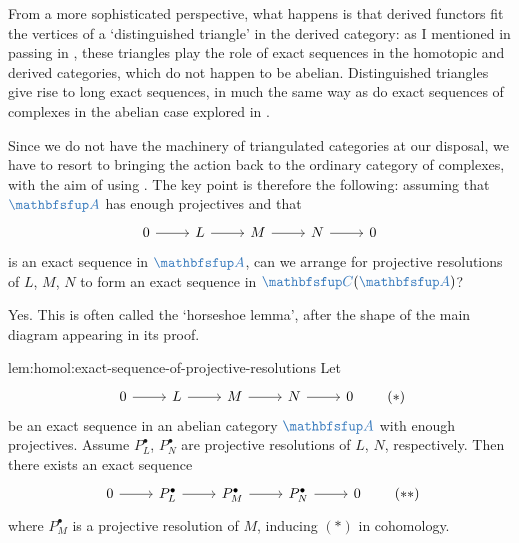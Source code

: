 From a more sophisticated perspective, what happens is that derived
functors fit the vertices of a `distinguished triangle' in the derived
category: as I mentioned in passing in
,
these triangles play the role of exact sequences in the homotopic and
derived categories, which do not happen to be abelian. Distinguished
triangles give rise to long exact sequences, in much the same way as
do exact sequences of complexes in the abelian case explored in
.

Since we do not have the machinery of triangulated categories at our
disposal, we have to resort to bringing the action back to the
ordinary category of complexes, with the aim of using
.  The key point is therefore the following: assuming
that $\categ{A}$ has enough projectives and that
\[\begin{tikzcd}
    0 \arrow[r] & L \arrow[r] & M \arrow[r] & N \arrow[r] & 0
  \end{tikzcd}\] is an exact sequence in $\categ{A}$, can we arrange
for projective resolutions of $L$, $M$, $N$ to form an exact sequence
in $\categ{C}(\categ{A})$?

Yes. This is often called the `horseshoe lemma', after the shape of
the main diagram appearing in its proof.

\begin{lem}{}{lem:homol:exact-sequence-of-projective-resolutions}
  Let
  \[\begin{tikzcd}
      0 \arrow[r] & L \arrow[r] & M \arrow[r] & N \arrow[r] & 0
    \end{tikzcd} \tag{$*$}\] be an exact sequence in an abelian
  category $\categ{A}$ with enough projectives. Assume $P_L^\bullet$,
  $P_N^\bullet$ are projective resolutions of $L$, $N$,
  respectively. Then there exists an exact sequence
  \[\begin{tikzcd}
      0 \arrow[r] & P_L^\bullet \arrow[r] & P_M^\bullet \arrow[r] &
      P_N^\bullet \arrow[r] & 0
    \end{tikzcd} \tag{$**$}\] where $P_M^\bullet$ is a projective
  resolution of $M$, inducing $(*)$ in cohomology.
\end{lem}

